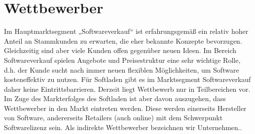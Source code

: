 \section{Wettbewerber}
Im Hauptmarktsegment „Softwareverkauf“ ist erfahrungsgemäß ein relativ hoher Anteil an Stammkunden zu erwarten, die eher bekannte Konzepte bevorzugen. Gleichzeitig sind aber viele Kunden offen gegenüber neuen Ideen. Im Bereich Softwareverkauf spielen Angebote und Preisestruktur eine sehr wichtige Rolle, d.h. der Kunde sucht nach immer neuen flexiblen Möglichkeiten, um Software kosteneffektiv zu nutzen. Für Softladen gibt es im Marktsegment Softwareverkauf daher keine Eintrittsbarrieren. Derzeit liegt Wettbewerb nur in Teilbereichen vor. Im Zuge des Markterfolges des Softladen ist aber davon auszugehen, dass Wettbewerber in den Markt eintreten werden. Diese werden einerseits Hersteller von Software, andererseits Retailers (auch online) mit dem Schwerpunkt Softwarelizenz sein.
Als indirekte Wettbewerber bezeichnen wir Unternehmen..

